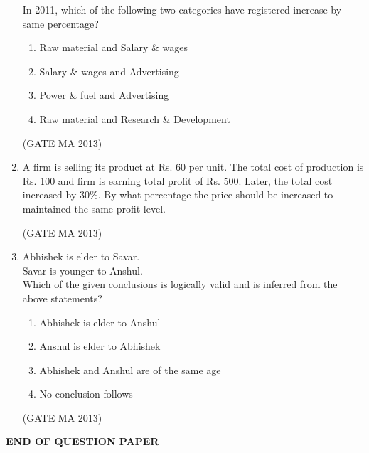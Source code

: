 \documentclass[journal,12pt,onecolumn]{IEEEtran}
\theoremstyle{remark}
\begin{document}
\begin{enumerate}
\begin{center}
    \end{center}
    In 2011, which of the following two categories have registered increase by same percentage?
    \begin{enumerate}
        \item Raw material and Salary \& wages
        \item Salary \& wages and Advertising
        \item Power \& fuel and Advertising
        \item Raw material and Research \& Development
    \end{enumerate}
    \hfill (GATE MA 2013)
    \item A firm is selling its product at Rs. 60 per unit. The total cost of production is Rs. 100 and firm is earning total profit of Rs. 500. Later, the total cost increased by 30\%. By what percentage the price should be increased to maintained the same profit level.
    \begin{enumerate}
    \end{enumerate}
    \hfill (GATE MA 2013)
    \item Abhishek is elder to Savar. \\
    Savar is younger to Anshul. \\
    Which of the given conclusions is logically valid and is inferred from the above statements?
    \begin{enumerate}
        \item Abhishek is elder to Anshul
        \item Anshul is elder to Abhishek
        \item Abhishek and Anshul are of the same age
        \item No conclusion follows
    \end{enumerate}
    \hfill (GATE MA 2013)
\end{enumerate}

\begin{center}
\textbf{END OF QUESTION PAPER}
\end{center}
\end{document}
